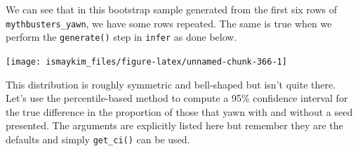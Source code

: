 \documentclass[12pt,]{krantz}
\makeatletter
\newenvironment{Shaded}{\begin{snugshade}}{\end{snugshade}}
\newcommand{\KeywordTok}[1]{\textcolor[rgb]{0.27,0.27,0.27}{\textbf{#1}}}
\newcommand{\DataTypeTok}[1]{\textcolor[rgb]{0.27,0.27,0.27}{#1}}
\newcommand{\DecValTok}[1]{\textcolor[rgb]{0.06,0.06,0.06}{#1}}
\newcommand{\FloatTok}[1]{\textcolor[rgb]{0.06,0.06,0.06}{#1}}
\newcommand{\StringTok}[1]{\textcolor[rgb]{0.5,0.5,0.5}{#1}}
\newcommand{\OperatorTok}[1]{\textcolor[rgb]{0.43,0.43,0.43}{\textbf{#1}}}
\newcommand{\NormalTok}[1]{#1}
\newenvironment{kframe}{%
\medskip{}
\setlength{\fboxsep}{.8em}
 \def\at@end@of@kframe{}%
 \ifinner\ifhmode%
  \def\at@end@of@kframe{\end{minipage}}%
  \begin{minipage}{\columnwidth}%
 \fi\fi%
 \def\FrameCommand##1{\hskip\@totalleftmargin \hskip-\fboxsep
 \colorbox{shadecolor}{##1}\hskip-\fboxsep
     \hskip-\linewidth \hskip-\@totalleftmargin \hskip\columnwidth}%
 \MakeFramed {\advance\hsize-\width
   \@totalleftmargin\z@ \linewidth\hsize
   \@setminipage}}%
 {\par\unskip\endMakeFramed%
 \at@end@of@kframe}
\renewenvironment{Shaded}{\begin{kframe}}{\end{kframe}}
\makeatother
\begin{document}
We can see that in this bootstrap sample generated from the first six
rows of \texttt{mythbusters\_yawn}, we have some rows repeated. The same
is true when we perform the \texttt{generate()} step in \texttt{infer}
as done below.

\begin{Shaded}
\end{Shaded}

\begin{Shaded}
\end{Shaded}

\begin{center}\texttt{[image: ismaykim\_files/figure-latex/unnamed-chunk-366-1]} \end{center}

This distribution is roughly symmetric and bell-shaped but isn't quite
there. Let's use the percentile-based method to compute a 95\%
confidence interval for the true difference in the proportion of those
that yawn with and without a seed presented. The arguments are
explicitly listed here but remember they are the defaults and simply
\texttt{get\_ci()} can be used.

\begin{Shaded}
\end{Shaded}
\end{document}
